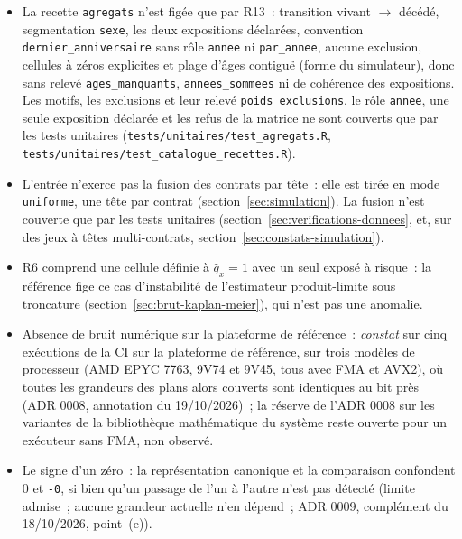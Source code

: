 \documentclass[a4paper,11pt]{article}
\newcommand{\code}[1]{\texttt{\small #1}}
\begin{document}
\begin{encadre}
\begin{itemize}[leftmargin=*, itemsep=1pt, topsep=2pt]
    que par les tests unitaires.
  \item La recette \code{agregats} n'est figée que par R13~: transition
    vivant $\to$ décédé, segmentation \code{sexe}, les deux expositions
    déclarées, convention \code{dernier\_anniversaire} sans rôle
    \code{annee} ni \code{par\_annee}, aucune exclusion, cellules à zéros
    explicites et plage d'âges contiguë (forme du simulateur), donc sans
    relevé \code{ages\_manquants}, \code{annees\_sommees} ni de cohérence
    des expositions. Les motifs, les exclusions et leur relevé
    \code{poids\_exclusions}, le rôle \code{annee}, une seule exposition
    déclarée et les refus de la matrice ne sont couverts que par les tests
    unitaires (\code{tests/unitaires/test\_agregats.R},
    \code{tests/unitaires/test\_catalogue\_recettes.R}).
  \item L'entrée n'exerce pas la fusion des contrats par tête~: elle est
    tirée en mode \code{uniforme}, une tête par contrat
    (section~\ref{sec:simulation}). La fusion n'est couverte que par les
    tests unitaires (section~\ref{sec:verifications-donnees}, et, sur des
    jeux à têtes multi-contrats, section~\ref{sec:constats-simulation}).
  \item R6 comprend une cellule définie à $\hat q_x = 1$ avec un seul exposé
    à risque~: la référence fige ce cas d'instabilité de l'estimateur
    produit-limite sous troncature (section~\ref{sec:brut-kaplan-meier}),
    qui n'est pas une anomalie.
  \item Absence de bruit numérique sur la plateforme de référence~:
    \emph{constat} sur cinq exécutions de la CI sur la plateforme de
    référence, sur trois modèles de processeur (AMD EPYC 7763, 9V74 et 9V45,
    tous avec FMA et AVX2), où toutes les grandeurs des plans alors couverts sont
    identiques au bit près (ADR 0008, annotation du 19/10/2026)~; la réserve
    de l'ADR 0008 sur les variantes de la bibliothèque mathématique du
    système reste ouverte pour un exécuteur sans FMA, non observé.
  \item Le signe d'un zéro~: la représentation canonique et la comparaison
    confondent 0 et \code{-0}, si bien qu'un passage de l'un à l'autre n'est
    pas détecté (limite admise~; aucune grandeur actuelle n'en dépend~;
    ADR 0009, complément du 18/10/2026, point~(e)).
\end{itemize}
\end{encadre}
\end{document}
